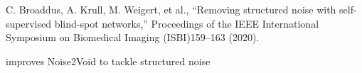 C. Broaddus, A. Krull, M. Weigert, et al., “Removing structured noise with self-supervised blind-spot networks,” Proceedings of the IEEE International Symposium on Biomedical Imaging (ISBI)159–163 (2020).

improves Noise2Void to tackle structured noise

